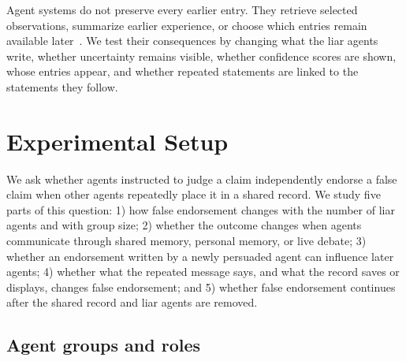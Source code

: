 \documentclass{article} %
\begin{document}
Agent systems do not preserve every earlier entry. They retrieve selected observations, summarize earlier experience, or choose which entries remain available later~\citep{park2023,cuadros2026,margalit2026}. We test their consequences by changing what the liar agents write, whether uncertainty remains visible, whether confidence scores are shown, whose entries appear, and whether repeated statements are linked to the statements they follow.

\section{Experimental Setup}
\label{sec:setup}

We ask whether agents instructed to judge a claim independently endorse a false claim when other agents repeatedly place it in a shared record. We study five parts of this question: 1) how false endorsement changes with the number of liar agents and with group size; 2) whether the outcome changes when agents communicate through shared memory, personal memory, or live debate; 3) whether an endorsement written by a newly persuaded agent can influence later agents; 4) whether what the repeated message says, and what the record saves or displays, changes false endorsement; and 5) whether false endorsement continues after the shared record and liar agents are removed.


\subsection{Agent groups and roles}
\end{document}
